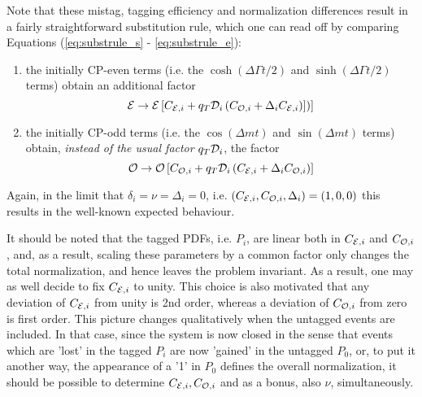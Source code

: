 \documentclass[a4paper,10pt,twosided]{article}
\begin{document}
Note that these mistag, tagging efficiency and normalization differences result in a fairly 
straightforward substitution rule, which one can read off by comparing Equations (\ref{eq:substrule_s} - \ref{eq:substrule_e}):
\begin{enumerate}
\item
the initially CP-even terms (i.e. the $\cosh(\Delta\Gamma t/2)$ and $\sinh(\Delta\Gamma t/2)$ terms) obtain an additional
factor 
\begin{equation}
   {\cal E} \rightarrow {\cal E} \left[ C_{{\cal E},i} + q_T {\cal D}_i \left( C_{{\cal O},i}+{\Delta}_i C_{{\cal E},i}) ]\right) \right]
\end{equation}
\item
the initially CP-odd terms (i.e. the $\cos(\Delta m t) $ and $\sin(\Delta m t)$ terms) obtain, { \em instead of the
usual factor} $q_T{\cal D}_i$, the factor
\begin{equation}
   {\cal O} \rightarrow {\cal O} \left[ C_{{\cal O},i} +  q_T {\cal D}_i  \left( C_{{\cal E},i} + {\Delta}_iC_{{\cal O},i} \right) \right]
\end{equation}
\end{enumerate}
Again, in the limit that $\delta_i=\nu={\Delta}_i=0$, i.e. $(C_{{\cal E},i},C_{{\cal O},i},\Delta_i) = (1,0,0)$ this results in the well-known expected behaviour.

It should be noted that the tagged PDFs, i.e. $P_i$, are linear both in $C_{{\cal E},i}$ and $C_{{\cal O},i}$,
and, as a result, scaling these parameters by a common 
factor only changes the total normalization, and hence leaves the problem invariant. As a result, one
may as well decide to fix $C_{{\cal E},i}$ to unity. This choice is also motivated that any deviation of $C_{{\cal E},i}$ from
unity is 2nd order, whereas a deviation of $C_{{\cal O},i}$ from zero is first order. 
This picture changes qualitatively when the untagged events are included. In that case, since
the system is now closed in the sense that events which are 'lost' in the tagged $P_i$ are now 
'gained' in the untagged $P_0$, or, to put it another way, the appearance of a '1' in $P_0$ defines
the overall normalization, it should be possible to determine $C_{{\cal E},i}, C_{{\cal O},i}$ and
as a bonus, also $\nu$, simultaneously.
\end{document}
